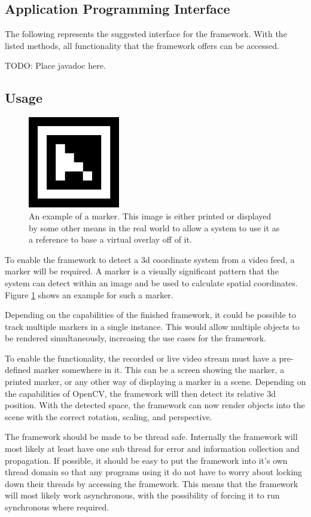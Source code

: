 \subsection{Application Programming Interface}

The following represents the suggested interface for the framework.
With the listed methods, all functionality that the framework offers can be accessed.

TODO: Place javadoc here.

\subsection{Usage}

\begin{figure}
	\centering
	\includegraphics[width=4cm]{images/marker_example.png}
	\caption[Example Marker.]{An example of a marker. This image is either printed or displayed by some other means in the real world to allow a system to use it as a reference to base a virtual overlay off of it.}
	\label{fig:marker_example}
\end{figure}

To enable the framework to detect a 3d coordinate system from a video feed, a marker will be required.
A marker is a visually significant pattern that the system can detect within an image and be used to calculate spatial coordinates. Figure \ref{fig:marker_example} shows an example for such a marker.

Depending on the capabilities of the finished framework, it could be possible to track multiple markers in a single instance.
This would allow multiple objects to be rendered simultaneously, increasing the use cases for the framework.

To enable the functionality, the recorded or live video stream must have a pre-defined marker somewhere in it.
This can be a screen showing the marker, a printed marker, or any other way of displaying a marker in a scene.
Depending on the capabilities of OpenCV, the framework will then detect its relative 3d position.
With the detected space, the framework can now render objects into the scene with the correct rotation, scaling, and perspective.

The framework should be made to be thread safe.
Internally the framework will most likely at least have one sub thread for error and information collection and propagation.
If possible, it should be easy to put the framework into it's own thread domain so that any programs using it do not have to worry about locking down their threads by accessing the framework.
This means that the framework will most likely work asynchronous, with the possibility of forcing it to run synchronous where required.

